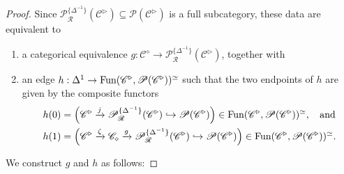 \documentclass{tac}
\newcommand{\s}[1]{\mathscr{#1}}
\newcommand{\tx}[1]{\textnormal{#1}}
\begin{document}
\begin{proof}
Since $\s{P}^{\{\Delta^{-1} \}}_\s{R} (\s{C}^\triangleright ) \subseteq \s{P}(\s{C}^\triangleright)$ is a full subcategory, these data are equivalent to 
\begin{enumerate}[label=(\alph*)]
\item\label{zetaisptlocalizationa} a categorical equivalence $g : \s{C}^\diamond \to \s{P}^{\{\Delta^{-1} \}}_\s{R} (\s{C}^\triangleright )$, together with 
\item\label{zetaisptlocalizationb} an edge $h : \Delta^1 \to \tx{Fun}(\s{C}^\triangleright , \s{P}(\s{C}^\triangleright))^\simeq$ such that the two endpoints of $h$ are given by the composite functors
\begin{align*}
h(0) & = \left( \s{C}^\triangleright \xrightarrow{j} \s{P}^{\{\Delta^{-1} \}}_\s{R} (\s{C}^\triangleright ) \hookrightarrow \s{P}(\s{C}^\triangleright) \right) \in \tx{Fun}(\s{C}^\triangleright , \s{P}(\s{C}^\triangleright))^\simeq , \tx{ \; and}\\
h(1) & = \left( \s{C}^\triangleright \xrightarrow{\zeta} \s{C}_\diamond \xrightarrow{g} \s{P}^{\{\Delta^{-1} \}}_\s{R} (\s{C}^\triangleright ) \hookrightarrow \s{P}(\s{C}^\triangleright) \right) \in \tx{Fun}(\s{C}^\triangleright , \s{P}(\s{C}^\triangleright))^\simeq .
\end{align*}
\end{enumerate}
We construct $g$ and $h$ as follows: 

\hfill


\end{proof}
\end{document}
